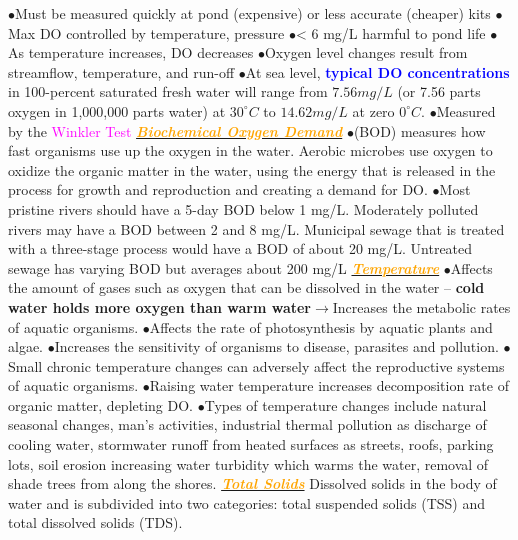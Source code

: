\documentclass{article}
\newcommand{\ddd}{$\bullet$}
\newcommand{\blue}[1]{\textcolor{blue}{#1}}
\newcommand{\pink}[1]{\textcolor{magenta}{#1}}
\newcommand{\orange}[1]{\textcolor{orange}{#1}}
\newcommand{\mysubsection}[1]{\underline{\textbf{{\textit{\orange{#1}}}}}}
\newcommand{\vocab}[1]{{\pink{#1}}}
\begin{document}
\begin{multicols*}{4}
                        \ddd Must be measured quickly at pond (expensive) or less accurate (cheaper) kits
            \ddd Max DO controlled by temperature, pressure
            \ddd < 6 mg/L harmful to pond life
            \ddd As temperature increases, DO decreases
            \ddd Oxygen level changes result from streamflow, temperature, and run-off
            \ddd At sea level, \textbf{\blue{typical DO concentrations}} in 100-percent saturated fresh water will range from $7.56 mg/L$ (or 7.56 parts oxygen in 1,000,000 parts water) at $30^\circ C$ to $14.62 mg/L$ at zero $0^\circ C$.
            \ddd Measured by the \vocab{Winkler Test}
        \mysubsection{Biochemical Oxygen Demand}
            \ddd (BOD) measures how fast organisms use up the oxygen in the water. Aerobic microbes use oxygen to oxidize the organic matter in the water, using the energy that is released in the process for growth and reproduction and creating a demand for DO.
            \ddd Most pristine rivers should have a 5-day BOD below 1 mg/L. Moderately polluted rivers may have a BOD between 2 and 8 mg/L. Municipal sewage that is treated with a three-stage process would have a BOD of about 20 mg/L. Untreated sewage has varying BOD but averages about 200 mg/L    
        \mysubsection{Temperature}
             \ddd Affects the amount of gases such as oxygen that can be dissolved in the water – \textbf{cold water holds more oxygen than warm water}$ \rightarrow $Increases the metabolic rates of aquatic organisms. 
             \ddd Affects the rate of photosynthesis by aquatic plants and algae. 
             \ddd Increases the sensitivity of organisms to disease, parasites and pollution. 
             \ddd Small chronic temperature changes can adversely affect the reproductive systems of aquatic organisms. 
             \ddd Raising water temperature increases decomposition rate of organic matter, depleting DO. \ddd Types of temperature changes include natural seasonal changes, man’s activities, industrial thermal pollution as discharge of cooling water, stormwater runoff from heated surfaces as streets, roofs, parking lots, soil erosion increasing water turbidity which warms the water, removal of shade trees from along the shores.
        \mysubsection{Total Solids} 
        	Dissolved solids in the body of water and is subdivided into two categories: total suspended solids (TSS) and total dissolved solids (TDS).
\end{multicols*}
\end{document}
